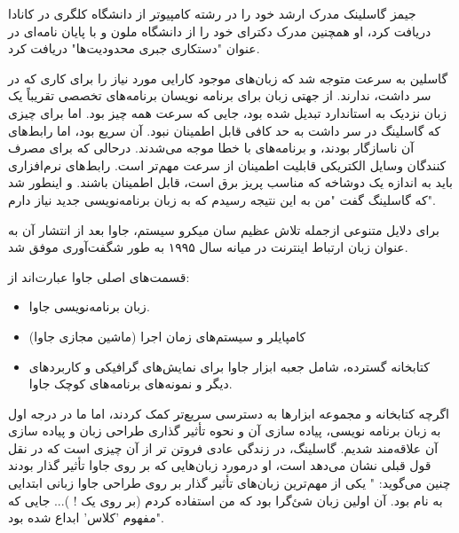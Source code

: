 \documentclass[a4paper,12pt]{report}
\begin{document}
\begin{center}
\begin{tcolorbox}[breakable]
		جیمز گاسلینک مدرک ارشد خود را در رشته کامپیوتر از دانشگاه کلگری 
		در کانادا دریافت کرد، او همچنین مدرک دکترای خود را از دانشگاه ملون و با پایان نامه‌ای در عنوان "دستکاری جبری محدودیت‌ها"
		 دریافت کرد.
		\end{tcolorbox}
		\begin{minipage}{0.9\linewidth}
	گاسلین به سرعت متوجه شد که زبان‌های موجود کارایی مورد نیاز را برای کاری که در سر داشت، ندارند. از جهتی زبان
	برای برنامه نویسان برنامه‌های تخصصی تقریباً یک زبان نزدیک به استاندارد تبدیل شده بود، جایی که سرعت همه چیز بود. اما 
	برای چیزی که گاسلینگ در سر داشت به حد کافی قابل اطمینان نبود. آن سریع بود، اما رابط‌های آن
	ناسازگار بودند، و برنامه‌های با خطا موجه می‌شدند. درحالی که برای مصرف کنندگان وسایل الکتریکی قابلیت اطمینان از سرعت مهم‌تر است.
	رابط‌های نرم‌افزاری باید به اندازه یک دوشاخه که مناسب پریز برق است، قابل اطمینان باشند. و اینطور شد که گاسلینگ گفت "من به این نتیجه رسیدم که به زبان برنامه‌نویسی جدید نیاز دارم".

		\end{minipage}
	\end{center}

	برای دلایل متنوعی ازجمله تلاش عظیم سان میکرو سیستم، ‌جاوا بعد از انتشار آن به عنوان زبان ارتباط اینترنت در میانه سال ۱۹۹۵ به طور شگفت‌آوری موفق شد.
	
	قسمت‌های اصلی جاوا عبارت‌اند از:
	
	\begin{itemize}[nosep]
		\renewcommand{\labelitemi}{\color{gray}\scriptsize$\blacksquare$}
		\item 
		زبان برنامه‌نویسی جاوا.
		\item
			کامپایلر و سیستم‌های زمان اجرا (ماشین مجازی جاوا)
		\item
		کتابخانه گسترده، شامل جعبه ابزار جاوا برای نمایش‌های گرافیکی و کاربرد‌های دیگر و نمونه‌های برنامه‌های کوچک جاوا.
	\end{itemize}

		اگرچه کتابخانه و مجموعه ابزارها به دسترسی سریع‌تر کمک کردند،‌ اما ما در درجه اول به زبان برنامه نویسی، پیاده سازی آن و نحوه تأثیر گذاری طراحی زبان و پیاده سازی آن علاقه‌مند شدیم.
	گاسلینگ،‌ در زندگی عادی فروتن تر از آن چیزی است که در نقل قول قبلی نشان می‌دهد است، او درمورد زبان‌هایی که بر روی جاوا تأثیر گذار بودند چنین می‌گوید: " یکی از مهم‌ترین زبان‌های تأثیر گذار بر روی طراحی جاوا زبانی ابتدایی به نام 
	\textit{}
	بود. آن اولین زبان شئ‌گرا بود که من استفاده کردم (بر روی یک 
	!
	)... جایی که مفهوم 'کلاس' ابداع شده بود".
	
\end{document}
